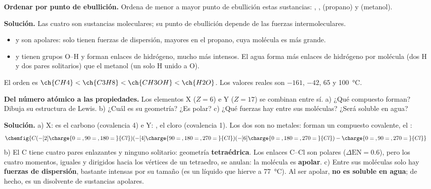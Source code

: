 \begin{example}
    \textbf{Ordenar por punto de ebullición.} Ordena de menor a mayor punto de ebullición estas sustancias: ,
    ,  (propano) y  (metanol).

    \textbf{Solución.} Las cuatro son sustancias moleculares; su punto de ebullición depende de las fuerzas intermoleculares.
    \begin{itemize}
        \item {} y  son apolares: solo tienen fuerzas de dispersión, mayores en el propano, cuya molécula es más
        grande.
        \item {} y  tienen grupos O--H y forman enlaces de hidrógeno, mucho más intensos. El agua forma más
        enlaces de hidrógeno por molécula (dos H y dos pares solitarios) que el metanol (un solo H unido a O).
    \end{itemize}
    El orden es \(\ch{CH4} < \ch{C3H8} < \ch{CH3OH} < \ch{H2O}\). Los valores reales son \(-161\), \(-42\), 65 y
    \qty{100}{\degreeCelsius}.
\end{example}

\begin{example}
    \textbf{Del número atómico a las propiedades.} Los elementos X (\(Z = 6\)) e Y (\(Z = 17\)) se combinan entre sí.
    a) ¿Qué compuesto forman? Dibuja su estructura de Lewis. b) ¿Cuál es su geometría? ¿Es polar? c) ¿Qué fuerzas hay entre sus
    moléculas? ¿Será soluble en agua?

    \textbf{Solución.} a) X:  es el carbono (covalencia 4) e Y: , el cloro
    (covalencia 1). Los dos son no metales: forman un compuesto covalente, el :
    \[ \chemfig{C(-[2]\charge{0=\:,90=\:,180=\:}{Cl})(-[4]\charge{90=\:,180=\:,270=\:}{Cl})(-[6]\charge{0=\:,180=\:,270=\:}{Cl})-\charge{0=\:,90=\:,270=\:}{Cl}} \]
    b) El C tiene cuatro pares enlazantes y ninguno solitario: geometría \textbf{tetraédrica}. Los enlaces C--Cl son polares
    (\(\Delta\mathrm{EN} = \num{0.6}\)), pero los cuatro momentos, iguales y dirigidos hacia los vértices de un tetraedro, se
    anulan: la molécula es \textbf{apolar}. c) Entre sus moléculas solo hay \textbf{fuerzas de dispersión}, bastante intensas por su
    tamaño (es un líquido que hierve a \qty{77}{\degreeCelsius}). Al ser apolar, \textbf{no es soluble en agua}; de hecho, es un
    disolvente de sustancias apolares.
\end{example}

